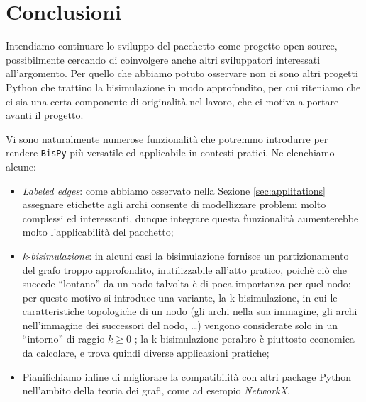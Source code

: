 \section{Conclusioni}
\label{sec:conclusions}

Intendiamo continuare lo sviluppo del pacchetto come progetto open source, possibilmente cercando di coinvolgere anche altri sviluppatori interessati all'argomento. Per quello che abbiamo potuto osservare non ci sono altri progetti Python che trattino la bisimulazione in modo approfondito, per cui riteniamo che ci sia una certa componente di originalità nel lavoro, che ci motiva a portare avanti il progetto.

Vi sono naturalmente numerose funzionalità che potremmo introdurre per rendere \texttt{BisPy} più versatile ed applicabile in contesti pratici. Ne elenchiamo alcune:
\begin{itemize}
    \item \emph{Labeled edges}: come abbiamo osservato nella Sezione \ref{sec:applitations} assegnare etichette agli archi consente di modellizzare problemi molto complessi ed interessanti, dunque integrare questa funzionalità aumenterebbe molto l'applicabilità del pacchetto;
    \item \emph{k-bisimulazione}: in alcuni casi la bisimulazione fornisce un partizionamento del grafo troppo approfondito, inutilizzabile all'atto pratico, poichè ciò che succede ``lontano'' da un nodo talvolta è di poca importanza per quel nodo; per questo motivo si introduce una variante, la k-bisimulazione, in cui le caratteristiche topologiche di un nodo (gli archi nella sua immagine, gli archi nell'immagine dei successori del nodo, \dots) vengono considerate solo in un ``intorno'' di raggio $k \geq 0$ \cite{kbisi}; la k-bisimulazione peraltro è piuttosto economica da calcolare, e trova quindi diverse applicazioni pratiche;
    \item Pianifichiamo infine di migliorare la compatibilità con altri package Python nell'ambito della teoria dei grafi, come ad esempio \emph{NetworkX}.
\end{itemize}
